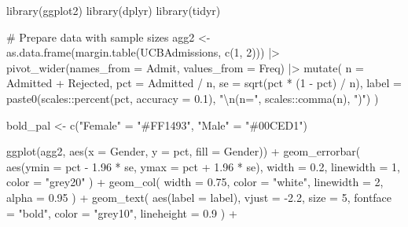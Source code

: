 \documentclass[
  letterpaper,
  DIV=11,
  numbers=noendperiod]{scrreprt}
\newenvironment{Shaded}{\begin{snugshade}}{\end{snugshade}}
\newcommand{\AttributeTok}[1]{\textcolor[rgb]{0.40,0.45,0.13}{#1}}
\newcommand{\CommentTok}[1]{\textcolor[rgb]{0.37,0.37,0.37}{#1}}
\newcommand{\DecValTok}[1]{\textcolor[rgb]{0.68,0.00,0.00}{#1}}
\newcommand{\FloatTok}[1]{\textcolor[rgb]{0.68,0.00,0.00}{#1}}
\newcommand{\FunctionTok}[1]{\textcolor[rgb]{0.28,0.35,0.67}{#1}}
\newcommand{\NormalTok}[1]{\textcolor[rgb]{0.00,0.23,0.31}{#1}}
\newcommand{\OtherTok}[1]{\textcolor[rgb]{0.00,0.23,0.31}{#1}}
\newcommand{\SpecialCharTok}[1]{\textcolor[rgb]{0.37,0.37,0.37}{#1}}
\newcommand{\StringTok}[1]{\textcolor[rgb]{0.13,0.47,0.30}{#1}}
\begin{document}
\begin{Shaded}
\begin{Highlighting}[]
\FunctionTok{library}\NormalTok{(ggplot2)}
\FunctionTok{library}\NormalTok{(dplyr)}
\FunctionTok{library}\NormalTok{(tidyr)}

\CommentTok{\# Prepare data with sample sizes}
\NormalTok{agg2 }\OtherTok{\textless{}{-}} \FunctionTok{as.data.frame}\NormalTok{(}\FunctionTok{margin.table}\NormalTok{(UCBAdmissions, }\FunctionTok{c}\NormalTok{(}\DecValTok{1}\NormalTok{, }\DecValTok{2}\NormalTok{))) }\SpecialCharTok{|\textgreater{}}
  \FunctionTok{pivot\_wider}\NormalTok{(}\AttributeTok{names\_from =}\NormalTok{ Admit, }\AttributeTok{values\_from =}\NormalTok{ Freq) }\SpecialCharTok{|\textgreater{}}
  \FunctionTok{mutate}\NormalTok{(}
    \AttributeTok{n =}\NormalTok{ Admitted }\SpecialCharTok{+}\NormalTok{ Rejected,}
    \AttributeTok{pct =}\NormalTok{ Admitted }\SpecialCharTok{/}\NormalTok{ n,}
    \AttributeTok{se =} \FunctionTok{sqrt}\NormalTok{(pct }\SpecialCharTok{*}\NormalTok{ (}\DecValTok{1} \SpecialCharTok{{-}}\NormalTok{ pct) }\SpecialCharTok{/}\NormalTok{ n),}
    \AttributeTok{label =} \FunctionTok{paste0}\NormalTok{(scales}\SpecialCharTok{::}\FunctionTok{percent}\NormalTok{(pct, }\AttributeTok{accuracy =} \FloatTok{0.1}\NormalTok{), }\StringTok{"}\SpecialCharTok{\textbackslash{}n}\StringTok{(n="}\NormalTok{, scales}\SpecialCharTok{::}\FunctionTok{comma}\NormalTok{(n), }\StringTok{")"}\NormalTok{)}
\NormalTok{  )}

\NormalTok{bold\_pal }\OtherTok{\textless{}{-}} \FunctionTok{c}\NormalTok{(}\StringTok{"Female"} \OtherTok{=} \StringTok{"\#FF1493"}\NormalTok{, }\StringTok{"Male"} \OtherTok{=} \StringTok{"\#00CED1"}\NormalTok{)}

\FunctionTok{ggplot}\NormalTok{(agg2, }\FunctionTok{aes}\NormalTok{(}\AttributeTok{x =}\NormalTok{ Gender, }\AttributeTok{y =}\NormalTok{ pct, }\AttributeTok{fill =}\NormalTok{ Gender)) }\SpecialCharTok{+}
  \FunctionTok{geom\_errorbar}\NormalTok{(}
    \FunctionTok{aes}\NormalTok{(}\AttributeTok{ymin =}\NormalTok{ pct }\SpecialCharTok{{-}} \FloatTok{1.96} \SpecialCharTok{*}\NormalTok{ se, }\AttributeTok{ymax =}\NormalTok{ pct }\SpecialCharTok{+} \FloatTok{1.96} \SpecialCharTok{*}\NormalTok{ se),}
    \AttributeTok{width =} \FloatTok{0.2}\NormalTok{,}
    \AttributeTok{linewidth =} \DecValTok{1}\NormalTok{,}
    \AttributeTok{color =} \StringTok{"grey20"}
\NormalTok{  ) }\SpecialCharTok{+}
  \FunctionTok{geom\_col}\NormalTok{(}
    \AttributeTok{width =} \FloatTok{0.75}\NormalTok{,}
    \AttributeTok{color =} \StringTok{"white"}\NormalTok{,}
    \AttributeTok{linewidth =} \DecValTok{2}\NormalTok{,}
    \AttributeTok{alpha =} \FloatTok{0.95}
\NormalTok{  ) }\SpecialCharTok{+}
  \FunctionTok{geom\_text}\NormalTok{(}
    \FunctionTok{aes}\NormalTok{(}\AttributeTok{label =}\NormalTok{ label),}
    \AttributeTok{vjust =} \SpecialCharTok{{-}}\FloatTok{2.2}\NormalTok{,}
    \AttributeTok{size =} \DecValTok{5}\NormalTok{,}
    \AttributeTok{fontface =} \StringTok{"bold"}\NormalTok{,}
    \AttributeTok{color =} \StringTok{"grey10"}\NormalTok{,}
    \AttributeTok{lineheight =} \FloatTok{0.9}
\NormalTok{  ) }\SpecialCharTok{+}
  

\end{Highlighting}
\end{Shaded}
\end{document}
